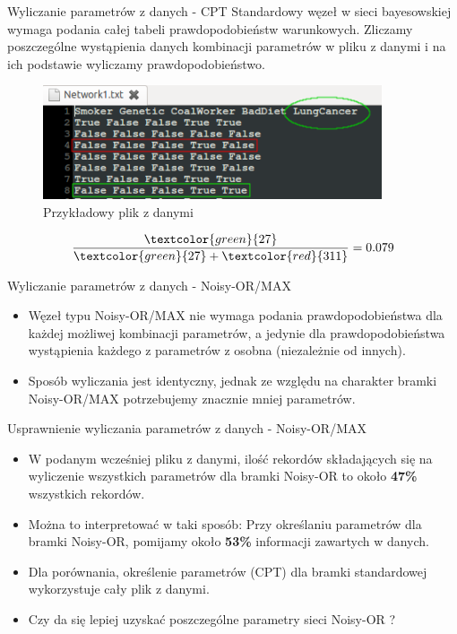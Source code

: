 \documentclass{beamer}
\begin{document}
\begin{frame}{Wyliczanie parametrów z danych - CPT}
	Standardowy węzeł w sieci bayesowskiej wymaga podania całej tabeli prawdopodobieństw warunkowych. 
	Zliczamy poszczególne wystąpienia danych kombinacji parametrów w pliku z danymi i na ich podstawie wyliczamy prawdopodobieństwo.

	\begin{figure}[h!]
		\centering
		\includegraphics[width=10cm]{4.png}
		\caption{Przykładowy plik z danymi}
	\end{figure}
	\begin{equation}
	\frac{\textcolor{green}{27}}{\textcolor{green}{27} + \textcolor{red}{311}} = 0.079
	\end{equation}
\end{frame}	
\begin{frame}{Wyliczanie parametrów z danych - Noisy-OR/MAX}
	\begin{itemize}
		\item Węzeł typu Noisy-OR/MAX nie wymaga podania prawdopodobieństwa dla każdej możliwej kombinacji parametrów, a jedynie dla prawdopodobieństwa wystąpienia każdego z parametrów z osobna (niezależnie od innych).
		\item Sposób wyliczania jest identyczny, jednak ze względu na charakter bramki Noisy-OR/MAX potrzebujemy znacznie mniej parametrów.
	\end{itemize}
\end{frame}

\begin{frame}{Usprawnienie wyliczania parametrów z danych - Noisy-OR/MAX}
	\begin{itemize}
		\item W podanym wcześniej pliku z danymi, ilość rekordów składających się na wyliczenie wszystkich parametrów dla bramki Noisy-OR to około \textbf{47\%} wszystkich rekordów.
		\item Można to interpretować w taki sposób: Przy określaniu parametrów dla bramki Noisy-OR, pomijamy około \textbf{53\%} informacji zawartych w danych.
		\item Dla porównania, określenie parametrów (CPT) dla bramki standardowej wykorzystuje cały plik z danymi.
		\pause \item Czy da się lepiej uzyskać poszczególne parametry sieci Noisy-OR ?
	\end{itemize}
\end{frame}
\end{document}
